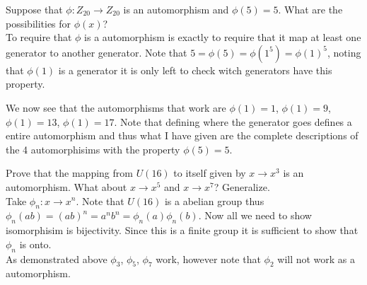 \documentclass[12pt]{article}
\makeatletter
\theoremstyle{homework}
\newenvironment{exercise}[1]
{\def\@currentlabel{#1}\exercisecore}
{\endexercisecore}
\makeatother
\begin{document}
\begin{exercise}{6.24}
Suppose that $\phi : Z_{20} \rightarrow Z_{20}$ is an automorphism and $\phi(5) = 5$. What are the possibilities for $\phi(x)$?\\
To require that $\phi$ is a automorphism is exactly to require that it map at least one generator to another generator.  Note that $5=\phi(5)=\phi(1^5)=\phi(1)^5$, noting that $\phi(1)$ is a generator it is only left to check witch generators have this property.
\newpage

We now see that the automorphisms that work are $\phi(1)=1$, $\phi(1)=9$, $\phi(1)=13$, $\phi(1)=17$.  Note that defining where the generator goes defines a entire automorphism and thus what I have given are the complete descriptions of the 4 automorphisims with the property $\phi(5) = 5$.
\end{exercise}

\begin{exercise}{6.26}
Prove that the mapping from $U(16)$ to itself given by $x \rightarrow x^3$ is an automorphism. What about $x \rightarrow x^5$ and $x \rightarrow x^7$? Generalize.\\
Take $\phi_n: x\rightarrow x^n$.  Note that $U(16)$ is a abelian group thus $\phi_n(ab)=(ab)^n=a^nb^n=\phi_n(a)\phi_n(b)$.  Now all we need to show isomorphisim is bijectivity.  Since this is a finite group it is sufficient to show that $\phi_n$ is onto.\\

As demonstrated above $\phi_3$, $\phi_5$, $\phi_7$ work, however note that $\phi_2$ will not work as a automorphism.
\end{exercise}
\end{document}
